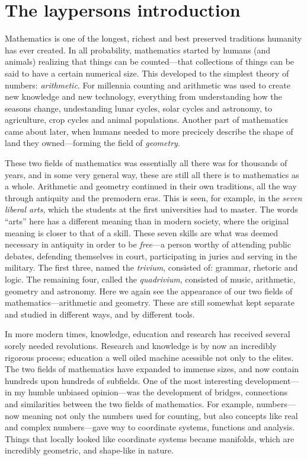 
\section{The laypersons introduction}

Mathematics is one of the longest, richest and best preserved traditions humanity has ever created. In all probability, mathematics started by humans (and animals) realizing that things can be counted---that collections of things can be said to have a certain numerical size. This developed to the simplest theory of numbers: \emph{arithmetic}. For millennia counting and arithmetic was used to create new knowledge and new technology, everything from understanding how the seasons change, undestanding lunar cycles, solar cycles and astronomy, to agriculture, crop cycles and animal populations. Another part of mathematics came about later, when humans needed to more precicely describe the shape of land they owned---forming the field of \emph{geometry}. 

These two fields of mathematics was essentially all there was for thousands of years, and in some very general way, these are still all there is to mathematics as a whole. Arithmetic and geometry continued in their own traditions, all the way through antiquity and the premodern eras. This is seen, for example, in the \emph{seven liberal arts}, which the students at the first universities had to master. The words ``arts'' here has a different meaning than in modern society, where the original meaning is closer to that of a skill. These seven skills are what was deemed necessary in antiquity in order to be \emph{free}---a person worthy of attending public debates, defending themselves in court, participating in juries and serving in the military. The first three, named the \emph{trivium}, consisted of: grammar, rhetoric and logic. The remaining four, called the \emph{quadrivium}, consisted of music, arithmetic, geometry and astronomy. Here we again see the appearance of our two fields of mathematics---arithmetic and geometry. These are still somewhat kept separate and studied in different ways, and by different tools. 

In more modern times, knowledge, education and research has received several sorely needed revolutions. Research and knowledge is by now an incredibly rigorous process; education a well oiled machine acessible not only to the elites. The two fields of mathematics have expanded to immense sizes, and now contain hundreds upon hundreds of subfields. One of the most interesting development---in my humble unbiased opinion---was the development of bridges, connections and similarities between the two fields of mathematics. For example, numbers---now meaning not only the numbers used for counting, but also concepts like real and complex numbers---gave way to coordinate systems, functions and analysis. Things that locally looked like coordinate systems became manifolds, which are incredibly geometric, and shape-like in nature. 


